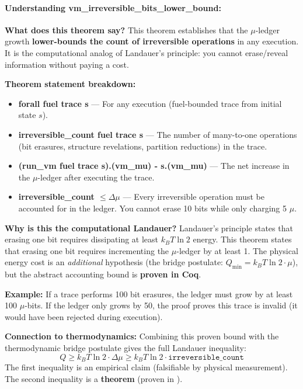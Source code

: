 \paragraph{Understanding vm\_irreversible\_bits\_lower\_bound:}

\textbf{What does this theorem say?} This theorem establishes that the $\mu$-ledger growth \textbf{lower-bounds the count of irreversible operations} in any execution. It is the computational analog of Landauer's principle: you cannot erase/reveal information without paying a cost.

\textbf{Theorem statement breakdown:}
\begin{itemize}
    \item \textbf{forall fuel trace s} — For any execution (fuel-bounded trace from initial state $s$).
    \item \textbf{irreversible\_count fuel trace s} — The number of many-to-one operations (bit erasures, structure revelations, partition reductions) in the trace.
    \item \textbf{(run\_vm fuel trace s).(vm\_mu) - s.(vm\_mu)} — The net increase in the $\mu$-ledger after executing the trace.
    \item \textbf{irreversible\_count $\leq \Delta\mu$} — Every irreversible operation must be accounted for in the ledger. You cannot erase 10 bits while only charging 5 $\mu$.
\end{itemize}

\textbf{Why is this the computational Landauer?} Landauer's principle states that erasing one bit requires dissipating at least $k_B T \ln 2$ energy. This theorem states that erasing one bit requires incrementing the $\mu$-ledger by at least 1. The physical energy cost is an \textit{additional} hypothesis (the bridge postulate: $Q_{\min} = k_B T \ln 2 \cdot \mu$), but the abstract accounting bound is \textbf{proven in Coq}.

\textbf{Example:} If a trace performs 100 bit erasures, the ledger must grow by at least 100 $\mu$-bits. If the ledger only grows by 50, the proof proves this trace is invalid (it would have been rejected during execution).

\textbf{Connection to thermodynamics:} Combining this proven bound with the thermodynamic bridge postulate gives the full Landauer inequality:
\[
    Q \geq k_B T \ln 2 \cdot \Delta\mu \geq k_B T \ln 2 \cdot \texttt{irreversible\_count}
\]
The first inequality is an empirical claim (falsifiable by physical measurement). The second inequality is a \textbf{theorem} (proven in ).


